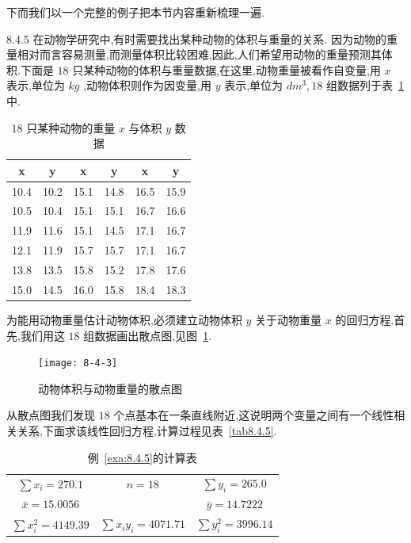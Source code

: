 下而我们以一个完整的例子把本节内容重新梳理一遍.
\begin{example}{}{8.4.5}
    在动物学研究中,有时需要找出某种动物的体积与重量的关系.
    因为动物的重量相对而言容易测量,而测量体积比较困难,因此,人们希望用动物的重量预测其体积.下面是 $18$ 只某种动物的体积与重量数据,在这里,动物重量被看作自变量,用 $x$ 表示,单位为 $kg$ ,动物体积则作为因变量,用 $y$ 表示,单位为 $dm^3,18$ 组数据列于表~\ref{tab:8.4.4}中.
    \begin{table}[htbp]
        \centering
        \caption{ $18$ 只某种动物的重量 $x$ 与体积 $y$ 数据}
        \begin{tabular}{cc||cc||cc}
            \toprule
            x     & y     & x     & y     & x     & y \\\midrule
            10.4  & 10.2  & 15.1  & 14.8  & 16.5  & 15.9  \\
            10.5  & 10.4  & 15.1  & 15.1  & 16.7  & 16.6  \\
            11.9  & 11.6  & 15.1  & 14.5  & 17.1  & 16.7  \\
            12.1  & 11.9  & 15.7  & 15.7  & 17.1  & 16.7  \\
            13.8  & 13.5  & 15.8  & 15.2  & 17.8  & 17.6  \\
            15.0  & 14.5  & 16.0  & 15.8  & 18.4  & 18.3  \\\bottomrule
        \end{tabular}%
        \label{tab:8.4.4}%
    \end{table}%
    为能用动物重量估计动物体积,必须建立动物体积 $y$ 关于动物重量 $x$ 的回归方程.首先,我们用这 $18$ 组数据画出散点图,见图~\ref{fig:8.4.3}.
    \begin{figure}[!htb]
        \centering
        \texttt{[image: 8-4-3]}
        \caption{动物体积与动物重量的散点图}
        \label{fig:8.4.3}
    \end{figure}
    从散点图我们发现 $18$ 个点基本在一条直线附近,这说明两个变量之间有一个线性相关关系,下面求该线性回归方程,计算过程见表~\ref{tab8.4.5}.
    \begin{table}[htbp]
        \centering
        \caption{例~\ref{exa:8.4.5}的计算表}
        \begin{tabular}{ccc}
         $\sum x_i=270.1$   &    $n=18$     &  $\sum y_i=265.0$  \\
         $\bar{x}=15.0056$   &       &  $\bar{y}=14.7222$  \\
         $\sum x_{i}^{2}=4149.39$   &    $\sum x_iy_i=4071.71$     &  $\sum y_{i}^{2}=3996.14$  \\

\end{tabular}
\end{table}
\end{example}
